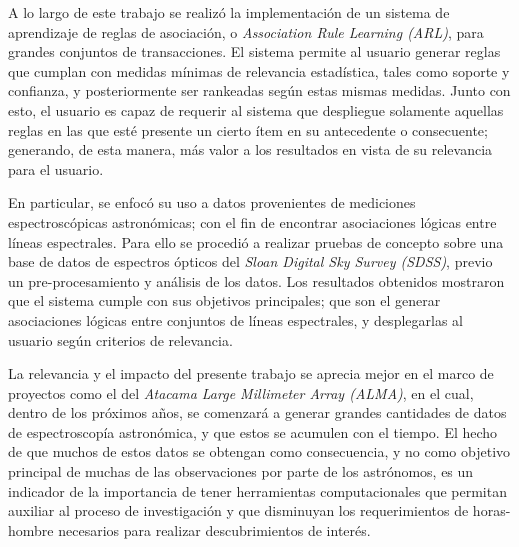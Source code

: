 \begin{conclusion}


A lo largo de este trabajo se realizó la implementación de un sistema de aprendizaje de reglas de asociación, o \textit{Association Rule Learning (ARL)}, para grandes conjuntos de transacciones. El sistema permite al usuario generar reglas que cumplan con medidas mínimas de relevancia estadística, tales como soporte y confianza, y posteriormente ser rankeadas según estas mismas medidas. Junto con esto, el usuario es capaz de requerir al sistema que despliegue solamente aquellas reglas en las que esté presente un cierto ítem en su antecedente o consecuente; generando, de esta manera, más valor a los resultados en vista de su relevancia para el usuario.

En particular, se enfocó su uso a datos provenientes de mediciones espectroscópicas astronómicas; con el fin de encontrar asociaciones lógicas entre líneas espectrales. Para ello se procedió a realizar pruebas de concepto sobre una base de datos de espectros ópticos del \textit{Sloan Digital Sky Survey (SDSS)}, previo un pre-procesamiento y análisis de los datos. Los resultados obtenidos mostraron que el sistema cumple con sus objetivos principales; que son el generar asociaciones lógicas entre conjuntos de líneas espectrales, y desplegarlas al usuario según criterios de relevancia.

La relevancia y el impacto del presente trabajo se aprecia mejor en el marco de proyectos como el del \textit{Atacama Large Millimeter Array (ALMA)}, en el cual, dentro de los próximos años, se comenzará a generar grandes cantidades de datos de espectroscopía astronómica, y que estos se acumulen con el tiempo. El hecho de que muchos de estos datos se obtengan como consecuencia, y no como objetivo principal de muchas de las observaciones por parte de los astrónomos, es un indicador de la importancia de tener herramientas computacionales que permitan auxiliar al proceso de investigación y que disminuyan los requerimientos de horas-hombre necesarios para realizar descubrimientos de interés.


\end{conclusion}
